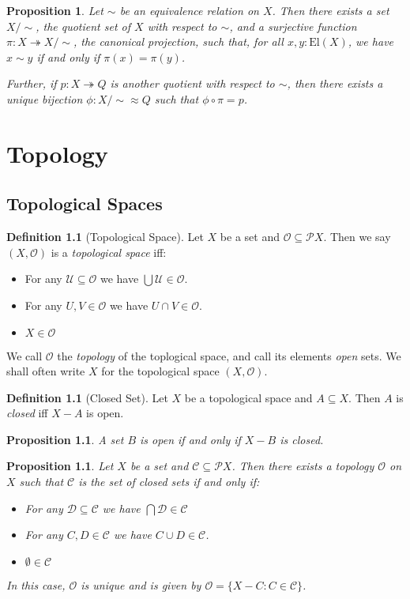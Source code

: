 \documentclass{book}
\newtheorem{prop}[ax]{Proposition}
\theoremstyle{definition}
\newtheorem{df}[ax]{Definition}
\newcommand{\El}[1]{\ensuremath{\mathrm{El} \left( {#1} \right)}}
\begin{document}
\begin{prop}
Let $\sim$ be an equivalence relation on $X$. Then there exists a set $X/\sim$, the \emph{quotient set} of $X$ with respect to $\sim$, and a surjective function $\pi : X \twoheadrightarrow X / \sim$, the \emph{canonical projection}, such that, for all $x,y : \El{X}$, we have $x \sim y$ if and only if $\pi(x) = \pi(y)$.

Further, if $p : X \twoheadrightarrow Q$ is another quotient with respect to $\sim$, then there exists a unique bijection $\phi : X / \sim \approx Q$ such that $\phi \circ \pi = p$.
\end{prop}

\chapter{Topology}

\section{Topological Spaces}

\begin{df}[Topological Space]
Let $X$ be a set and $\mathcal{O} \subseteq \mathcal{P} X$. Then we say $(X, \mathcal{O})$ is a \emph{topological space} iff:
\begin{itemize}
\item For any $\mathcal{U} \subseteq \mathcal{O}$ we have $\bigcup \mathcal{U} \in \mathcal{O}$.
\item For any $U, V \in \mathcal{O}$ we have $U \cap V \in \mathcal{O}$.
\item $X \in \mathcal{O}$
\end{itemize}
We call $\mathcal{O}$ the \emph{topology} of the toplogical space, and call its elements \emph{open} sets. We shall often write $X$ for the topological space $(X, \mathcal{O})$.
\end{df}

\begin{df}[Closed Set]
Let $X$ be a topological space and $A \subseteq X$. Then $A$ is \emph{closed} iff $X - A$ is open.
\end{df}

\begin{prop}
A set $B$ is open if and only if $X - B$ is closed.
\end{prop}

\begin{prop}
Let $X$ be a set and $\mathcal{C} \subseteq \mathcal{P} X$. Then there exists a topology $\mathcal{O}$ on $X$ such that $\mathcal{C}$ is the set of closed sets if and only if:
\begin{itemize}
\item For any $\mathcal{D} \subseteq \mathcal{C}$ we have $\bigcap \mathcal{D} \in \mathcal{C}$
\item For any $C, D \in \mathcal{C}$ we have $C \cup D \in \mathcal{C}$.
\item $\emptyset \in \mathcal{C}$
\end{itemize}
In this case, $\mathcal{O}$ is unique and is given by $\mathcal{O} = \{ X - C : C \in \mathcal{C} \}$.
\end{prop}
\end{document}

